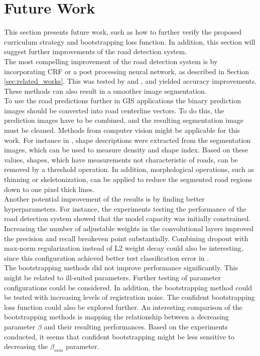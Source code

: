 \section{Future Work}
\label{sec:futureWork}
This section presents future work, such as how to further verify the proposed curriculum strategy and bootstrapping loss function. In addition, this section will suggest further improvements of the road detection system.\\

The most compelling improvement of the road detection system is by incorporating \ac{CRF} or a post processing neural network, as described in Section \ref{sec:related_works}. This was tested by \cite{Kluckner_semantic_height} and \cite{Mnih_aerial_images_noisy}, and yielded accuracy improvements. These methods can also result in a smoother image segmentation. \\

To use the road predictions further in GIS applications the binary prediction images should be converted into road centerline vectors. To do this, the prediction images have to be combined, and the resulting segmentation image must be cleaned. Methods from computer vision might be applicable for this work. For instance in \citep{Song_road_extraction_svm}, shape descriptions were extracted from the segmentation images, which can be used to measure density and shape index. Based on these values, shapes, which have measurements not characteristic of roads, can be removed by a threshold operation. In addition, morphological operations, such as thinning or skeletonization, can be applied to reduce the segmented road regions down to one pixel thick lines.\\

Another potential improvement of the results is by finding better hyperparameters. For instance, the experiments testing the performance of the road detection system showed that the model capacity was initially constrained. Increasing the number of adjustable weights in the convolutional layers improved the precision and recall breakeven point substantially. Combining dropout with max-norm regularization instead of L2 weight decay could also be interesting, since this configuration achieved better test classification error in \citep{Srivastava_dropout}.\\

The bootstrapping methods did not improve performance significantly. This might be related to ill-suited parameters. Further testing of parameter configurations could be considered. In addition, the bootstrapping method could be tested with increasing levels of registration noise. The confident bootstrapping loss function could also be explored further. An interesting comparison of the bootstrapping methods is mapping the relationship between a decreasing parameter $\beta$ and their resulting performances. Based on the experiments conducted, it seems that confident bootstrapping might be less sensitive to decreasing the $\beta_{min}$ parameter.\\


